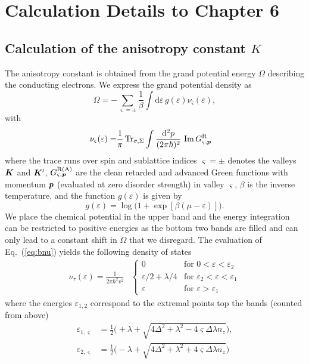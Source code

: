 \chapter{Calculation Details to Chapter 6}\label{app:D}
\section{Calculation of the anisotropy constant $K$}
The anisotropy constant is obtained from the grand potential energy $\Omega$ describing the conducting electrons. We express the grand potential density as
\begin{equation}
    \Omega = { -} \sum_{\varsigma=\pm}\frac{1}{\beta} \int \mathrm{d}\varepsilon\,g(\varepsilon) \nu_\varsigma(\varepsilon),
    \label{eq:b1}
\end{equation}
with
\begin{align}
    \nu_\varsigma(\varepsilon) = & \frac{1}{\pi} \operatorname{Tr}_{\sigma,\Sigma} \int \frac{\mathrm{d}^2p}{(2\pi\hbar)^2}\,\operatorname{Im} G^\text{R}_{\varsigma,\boldsymbol{p}}
    \label{eq:bnu}
\end{align}
where the trace runs over spin and sublattice indices $\varsigma=\pm$ denotes the valleys $\boldsymbol{K}$ and $\boldsymbol{K}'$,  $G^\text{R(A)}_{\varsigma,\boldsymbol{p}}$ are the clean retarded and advanced Green functions with momentum $\boldsymbol{p}$ (evaluated at zero disorder strength) in valley $\varsigma$, $\beta$ is the inverse temperature, and the function $g(\varepsilon)$ is given by
\begin{equation}
    g(\varepsilon) = \log \big(1+\exp[\beta(\mu-\varepsilon)]\big).
\end{equation}
We place the chemical potential in the upper band and the energy integration can be restricted to positive energies as the bottom two bands are filled and can only lead to a constant shift in $\Omega$ that we disregard. The evaluation of Eq.~(\ref{eq:bnu}) yields the following density of states
\begin{align}
    \nu_\tau(\varepsilon) 
    = \frac{1}{2\pi \hbar^2 v^2}& \begin{cases}
    0 & \text{for } 0 < \varepsilon < \varepsilon_2\\
    \varepsilon/2 +\lambda/4 & \text{for } \varepsilon_2 < \varepsilon < \varepsilon_1\\
    \varepsilon & \text{for } \varepsilon > \varepsilon_1
    \end{cases}
\end{align} 
where the energies $\varepsilon_{1,2}$ correspond to the extremal points top the bands (counted from above)
\begin{align}
    \varepsilon_{1,\varsigma} & = \frac{1}{2}\big(+\lambda+\sqrt{4\Delta^2+\lambda^2-4\varsigma\Delta\lambda n_z} \big),    \label{eq:elimits1}\\
    \varepsilon_{2,\varsigma} & = \frac{1}{2}\big(-\lambda+\sqrt{4\Delta^2+\lambda^2+4\varsigma\Delta\lambda n_z} \big)
    \label{eq:elimits2}
\end{align}

